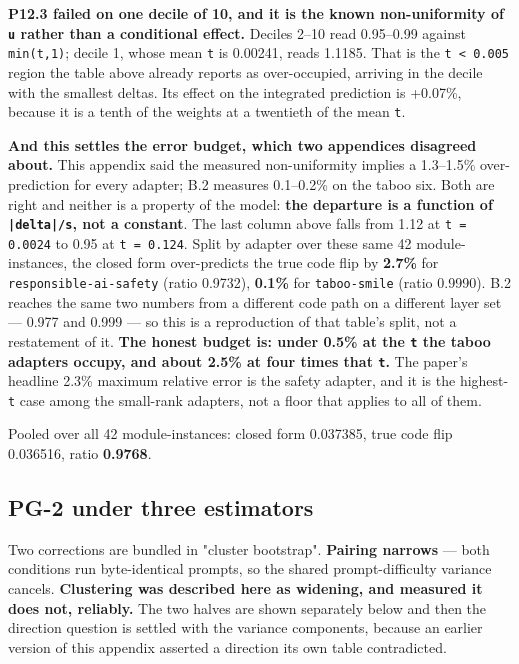 \textbf{P12.3 failed on one decile of 10, and it is the known non-uniformity of \texttt{u} rather than a conditional effect.} Deciles 2--10 read 0.95--0.99 against \texttt{min(t,1)}; decile 1, whose mean \texttt{t} is 0.00241, reads 1.1185. That is the \texttt{t < 0.\allowbreak{}005} region the table above already reports as over-occupied, arriving in the decile with the smallest deltas. Its effect on the integrated prediction is +0.07\%, because it is a tenth of the weights at a twentieth of the mean \texttt{t}.

\textbf{And this settles the error budget, which two appendices disagreed about.} This appendix said the measured non-uniformity implies a 1.3--1.5\% over-prediction for every adapter; B.2 measures 0.1--0.2\% on the taboo six. Both are right and neither is a property of the model: \textbf{the departure is a function of \texttt{|delta|/\allowbreak{}s}, not a constant}. The last column above falls from 1.12 at \texttt{t = 0.\allowbreak{}0024} to 0.95 at \texttt{t = 0.\allowbreak{}124}. Split by adapter over these same 42 module-instances, the closed form over-predicts the true code flip by \textbf{2.7\%} for \texttt{responsible-\allowbreak{}ai-\allowbreak{}safety} (ratio 0.9732), \textbf{0.1\%} for \texttt{taboo-\allowbreak{}smile} (ratio 0.9990). B.2 reaches the same two numbers from a different code path on a different layer set --- 0.977 and 0.999 --- so this is a reproduction of that table's split, not a restatement of it. \textbf{The honest budget is: under 0.5\% at the \texttt{t} the taboo adapters occupy, and about 2.5\% at four times that \texttt{t}.} The paper's headline 2.3\% maximum relative error is the safety adapter, and it is the highest-\texttt{t} case among the small-rank adapters, not a floor that applies to all of them.

Pooled over all 42 module-instances: closed form 0.037385, true code flip 0.036516, ratio \textbf{0.9768}.

\subsection{PG-2 under three estimators}

Two corrections are bundled in "cluster bootstrap". \textbf{Pairing narrows} --- both conditions run byte-identical prompts, so the shared prompt-difficulty variance cancels. \textbf{Clustering was described here as widening, and measured it does not, reliably.} The two halves are shown separately below and then the direction question is settled with the variance components, because an earlier version of this appendix asserted a direction its own table contradicted.

